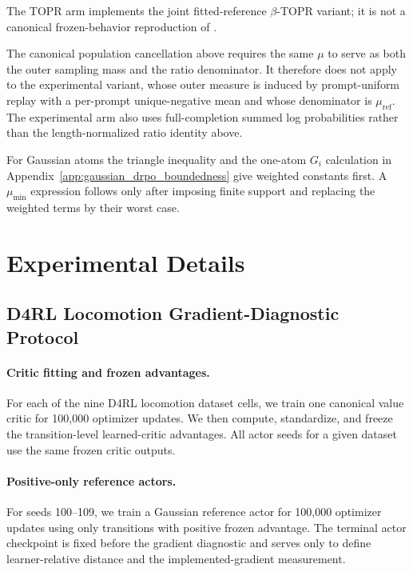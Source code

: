 \documentclass[sigconf,anonymous,review]{acmart}
\theoremstyle{acmdefinition}
\begin{document}
The TOPR arm implements the joint fitted-reference
\(\beta\)-TOPR variant; it is not a canonical frozen-behavior
reproduction of \citet{leroux2025tapered}.

The canonical population cancellation above requires the same
\(\mu\) to serve as both the outer sampling mass and the ratio
denominator. It therefore does not apply to the experimental variant,
whose outer measure is induced by prompt-uniform replay with a
per-prompt unique-negative mean and whose denominator is
\(\mu_{\mathrm{ref}}\). The experimental arm also uses
full-completion summed log probabilities rather than the
length-normalized ratio identity above.

For Gaussian atoms the
triangle inequality and the one-atom \(G_i\) calculation in
Appendix~\ref{app:gaussian_drpo_boundedness} give weighted constants
first. A \(\mu_{\min}\) expression follows only after imposing finite
support and replacing the weighted terms by their worst case.

\section{Experimental Details}
\label{app:experimental_details}

\subsection{D4RL Locomotion Gradient-Diagnostic Protocol}
\label{app:d4rl_gradient_diagnostic}

\paragraph{Critic fitting and frozen advantages.}
For each of the nine D4RL locomotion dataset cells, we train one canonical
value critic for 100,000 optimizer updates. We then compute, standardize, and
freeze the transition-level learned-critic advantages. All actor seeds for a
given dataset use the same frozen critic outputs.

\paragraph{Positive-only reference actors.}
For seeds 100--109, we train a Gaussian reference actor for 100,000 optimizer
updates using only transitions with positive frozen advantage. The terminal
actor checkpoint is fixed before the gradient diagnostic and serves only to
define learner-relative distance and the implemented-gradient measurement.
\end{document}
